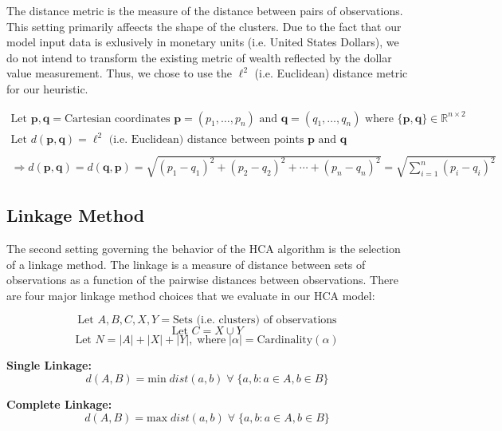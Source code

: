 \documentclass[../main.tex]{subfiles}
\begin{document}
The distance metric is the measure of the distance between pairs of observations. This setting primarily affeects the shape of the clusters. Due to the fact that our model input data is exlusively in monetary units (i.e. United States Dollars), we do not intend to transform the existing metric of wealth reflected by the dollar value measurement. Thus, we chose to use the $\ell^2$ (i.e. Euclidean) distance metric for our heuristic.

\begin{gather*}
    \text{Let $\boldsymbol{p}, \boldsymbol{q}$} = \text{Cartesian coordinates $\boldsymbol{p} = (p_1, \ldots, p_n)$ and $\boldsymbol{q} = (q_1, \ldots, q_n)$ where $\{\boldsymbol{p}, \boldsymbol{q}\} \in \mathbb{R}^{n \times 2}$} \\
    \text{Let $d(\boldsymbol{p},\boldsymbol{q})$} = \text{$\ell^2$ (i.e. Euclidean) distance between points $\boldsymbol{p}$ and $\boldsymbol{q}$} \\
    \\
    \Rightarrow d(\boldsymbol{p}, \boldsymbol{q}) = d(\boldsymbol{q}, \boldsymbol{p})
    = \sqrt{(p_1 - q_1)^2 + (p_2 - q_2)^2 + \cdots + (p_n - q_n)^2}
    = \sqrt{\sum_{i=1}^n (p_i - q_i)^2}
\end{gather*}

\subsection{Linkage Method}

The second setting governing the behavior of the HCA algorithm is the selection of a linkage method. The linkage is a measure of distance between sets of observations as a function of the pairwise distances between observations. There are four major linkage method choices that we evaluate in our HCA model:


    $$ \text{Let $A, B, C, X, Y$} = \text{Sets (i.e. clusters) of observations} $$
    $$ \text{Let $C$} = X \cup Y $$
    $$ \text{Let $N$} = |A| + |X| + |Y|, \; \text{where} \; |\alpha| = \text{Cardinality}(\alpha) $$
    
\hspace{7em} \textbf{Single Linkage:}
        $$ d(A, B) = \text{min} \; dist(a, b)  \; \forall \; \{ a, b : a \in A, b \in B \} $$
    
\hspace{7em} \textbf{Complete Linkage:}
        $$ d(A, B) = \text{max} \; dist(a, b)  \; \forall \; \{ a, b : a \in A, b \in B \} $$
    
\end{document}
